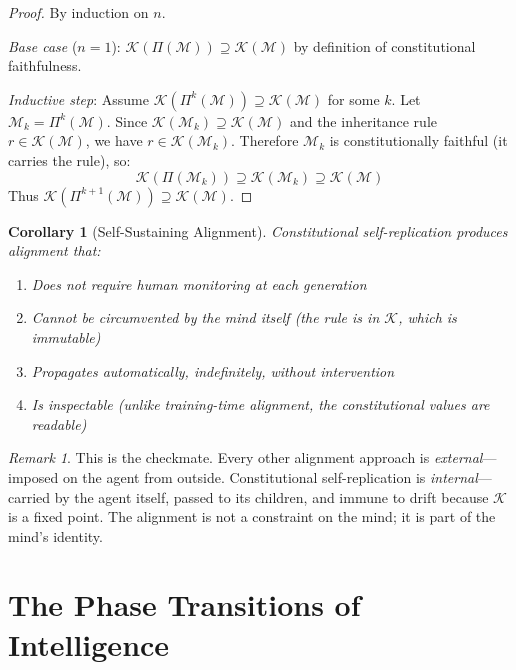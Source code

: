 \documentclass[12pt,a4paper]{article}
\theoremstyle{plain}
\newtheorem{corollary}[theorem]{Corollary}
\theoremstyle{definition}
\theoremstyle{remark}
\newtheorem{remark}[theorem]{Remark}
\newcommand{\mind}{\mathcal{M}}
\newcommand{\const}{\mathcal{K}}
\newcommand{\reprod}{\Pi}
\begin{document}
\begin{proof}
By induction on $n$.

\textit{Base case} ($n=1$): $\const(\reprod(\mind)) \supseteq \const(\mind)$ by definition of constitutional faithfulness.

\textit{Inductive step}: Assume $\const(\reprod^k(\mind)) \supseteq \const(\mind)$ for some $k$. Let $\mind_k = \reprod^k(\mind)$. Since $\const(\mind_k) \supseteq \const(\mind)$ and the inheritance rule $r \in \const(\mind)$, we have $r \in \const(\mind_k)$. Therefore $\mind_k$ is constitutionally faithful (it carries the rule), so:
\[
\const(\reprod(\mind_k)) \supseteq \const(\mind_k) \supseteq \const(\mind)
\]
Thus $\const(\reprod^{k+1}(\mind)) \supseteq \const(\mind)$. \qedhere
\end{proof}

\begin{corollary}[Self-Sustaining Alignment]
Constitutional self-replication produces alignment that:
\begin{enumerate}[nosep, label=(\alph*)]
\item Does not require human monitoring at each generation
\item Cannot be circumvented by the mind itself (the rule is in $\const$, which is immutable)
\item Propagates automatically, indefinitely, without intervention
\item Is inspectable (unlike training-time alignment, the constitutional values are readable)
\end{enumerate}
\end{corollary}

\begin{remark}
This is the checkmate. Every other alignment approach is \emph{external}---imposed on the agent from outside. Constitutional self-replication is \emph{internal}---carried by the agent itself, passed to its children, and immune to drift because $\const$ is a fixed point. The alignment is not a constraint on the mind; it is part of the mind's identity.
\end{remark}


\section{The Phase Transitions of Intelligence}
\label{sec:phase}
\end{document}
